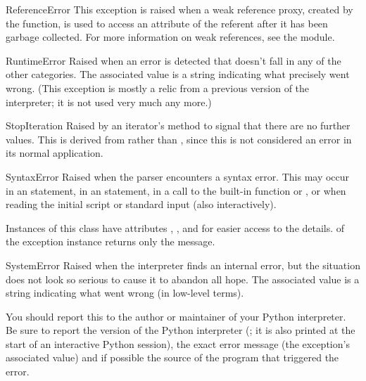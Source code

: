 \begin{excdesc}{ReferenceError}
  This exception is raised when a weak reference proxy, created by the
   function, is used to access
  an attribute of the referent after it has been garbage collected.
  For more information on weak references, see the 
  module.
\end{excdesc}

\begin{excdesc}{RuntimeError}
  Raised when an error is detected that doesn't fall in any of the
  other categories.  The associated value is a string indicating what
  precisely went wrong.  (This exception is mostly a relic from a
  previous version of the interpreter; it is not used very much any
  more.)
\end{excdesc}

\begin{excdesc}{StopIteration}
  Raised by an iterator's  method to signal that there
  are no further values.
  This is derived from  rather than
  , since this is not considered an error in
  its normal application.
\end{excdesc}


\begin{excdesc}{SyntaxError}
  Raised when the parser encounters a syntax error.  This may occur in
  an  statement, in an  statement, in a call
  to the built-in function  or , or
  when reading the initial script or standard input (also
  interactively).

  Instances of this class have attributes ,
  ,  and  for easier access
  to the details.   of the exception instance returns
  only the message.
\end{excdesc}

\begin{excdesc}{SystemError}
  Raised when the interpreter finds an internal error, but the
  situation does not look so serious to cause it to abandon all hope.
  The associated value is a string indicating what went wrong (in
  low-level terms).
  
  You should report this to the author or maintainer of your Python
  interpreter.  Be sure to report the version of the Python
  interpreter (; it is also printed at the start of an
  interactive Python session), the exact error message (the exception's
  associated value) and if possible the source of the program that
  triggered the error.
\end{excdesc}

